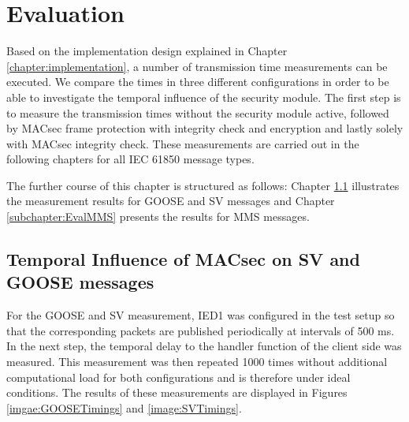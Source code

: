 \documentclass[conference, onecolumn, a4paper]{IEEEtran}
\begin{document}
\section{Evaluation}
\label{chapter:evaluation}
\noindent Based on the implementation design explained in Chapter \ref{chapter:implementation}, a number of transmission time measurements can be 
executed. We compare the times in three different configurations in order to be able to investigate the temporal influence of the security module. 
The first step is to measure the transmission times without the security module active, followed by MACsec frame protection with integrity check and 
encryption and lastly solely with MACsec integrity check. These measurements are carried out in the following chapters for all IEC 61850 message types.

\smallskip
The further course of this chapter is structured as follows: Chapter \ref{subchapter:EvalGOOSESV} illustrates the measurement results for GOOSE and SV 
messages and Chapter \ref{subchapter:EvalMMS} presents the results for MMS messages.

\subsection{Temporal Influence of MACsec on SV and GOOSE messages}
\label{subchapter:EvalGOOSESV}
\noindent For the GOOSE and SV measurement, IED1 was configured in the test setup so that the corresponding packets are published periodically at 
intervals of 500 ms. In the next step, the temporal delay to the handler function of the client side was measured. This measurement was then repeated 
1000 times without additional computational load for both configurations and is therefore under ideal conditions. The results of these measurements 
are displayed in Figures \ref{imgae:GOOSETimings} and \ref{image:SVTimings}.
\end{document}
